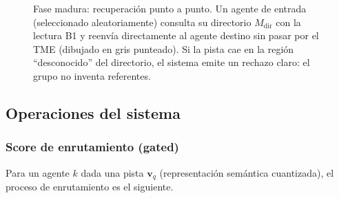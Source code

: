 \begin{figure}[H]
{%
}
\caption{Fase madura: recuperación punto a punto.
Un agente de entrada (seleccionado aleatoriamente) consulta su directorio $M_{\mathrm{dir}}$
con la lectura B1 y reenvía directamente al agente destino sin pasar por el TME
(dibujado en gris punteado).
Si la pista cae en la región ``desconocido'' del directorio, el sistema emite un rechazo
claro: el grupo no inventa referentes.}
\label{fig:arq-madura}
\end{figure}

\subsection{Operaciones del sistema}
\label{sec:operaciones}

\subsubsection*{Score de enrutamiento (gated)}

Para un agente $k$ dada una pista $\mathbf{v}_q$ (representación semántica cuantizada),
el proceso de enrutamiento es el siguiente.

